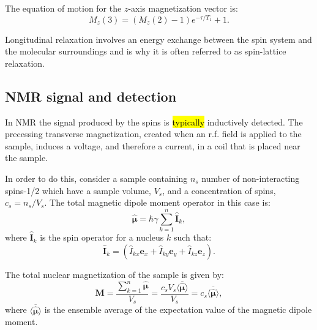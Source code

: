 The equation of motion for the $z$-axis magnetization vector is:
\begin{equation}
  M_z(3) = (M_z(2) - 1)e^{-\tau/T_1} + 1.
\end{equation}

Longitudinal relaxation involves an energy exchange between the spin system and the molecular
surroundings and is why it is often referred to as spin-lattice relaxation.

\subsection{NMR signal and detection}\label{Signal}

In NMR the signal produced by the spins is \hl{typically} inductively detected. The precessing transverse magnetization, created
when an r.f. field is applied to the sample, induces a voltage, and therefore a current, in a coil that
is placed near the sample.

In order to do this, consider a sample containing $n_s$ number of non-interacting spins-1/2 which have a
sample volume, $V_s$, and a concentration of spins, $c_s = n_s/V_s$.
The total magnetic dipole moment operator in this case is:
\begin{equation}\label{eqn:MagneticMoment}
  \hat{\pmb{\mu}} = \hbar\gamma\sum_{k=1}^n\mathbf{\hat{I}}_k,
\end{equation}
where $\mathbf{\hat{I}}_k$ is the spin operator for a nucleus $k$ such that:
\begin{equation}
  \mathbf{\hat{I}}_k = (\hat{I}_{kx}\mathbf{e}_x + \hat{I}_{ky}\mathbf{e}_y + \hat{I}_{kz}\mathbf{e}_z).
\end{equation}

The total nuclear magnetization of the sample is given by:
\begin{equation}\label{eqn:magnetization}
  \mathbf{M} = \frac{\sum_{k=1}^n\hat{\pmb{\mu}}}{V_s} = \frac{c_sV_s\langle\overbar{\hat{\pmb{\mu}}}\rangle}{V_s} = c_s\langle\overbar{\hat{\pmb{\mu}}}\rangle,
\end{equation}
where $\langle\overbar{\hat{\pmb{\mu}}}\rangle$ is the ensemble average of the expectation value of the magnetic dipole moment.

